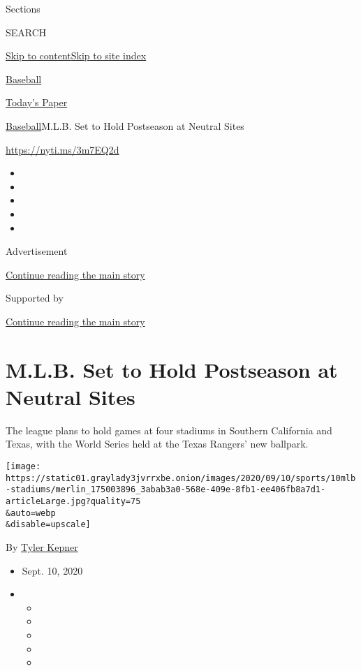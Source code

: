 Sections

SEARCH

\protect\hyperlink{site-content}{Skip to
content}\protect\hyperlink{site-index}{Skip to site index}

\href{https://www.nytimes3xbfgragh.onion/section/sports/baseball}{Baseball}

\href{https://myaccount.nytimes3xbfgragh.onion/auth/login?response_type=cookie\&client_id=vi}{}

\href{https://www.nytimes3xbfgragh.onion/section/todayspaper}{Today's
Paper}

\href{/section/sports/baseball}{Baseball}\textbar{}M.L.B. Set to Hold
Postseason at Neutral Sites

\url{https://nyti.ms/3m7EQ2d}

\begin{itemize}
\item
\item
\item
\item
\item
\end{itemize}

Advertisement

\protect\hyperlink{after-top}{Continue reading the main story}

Supported by

\protect\hyperlink{after-sponsor}{Continue reading the main story}

\hypertarget{mlb-set-to-hold-postseason-at-neutral-sites}{%
\section{M.L.B. Set to Hold Postseason at Neutral
Sites}\label{mlb-set-to-hold-postseason-at-neutral-sites}}

The league plans to hold games at four stadiums in Southern California
and Texas, with the World Series held at the Texas Rangers' new
ballpark.

\texttt{[image: https://static01.graylady3jvrrxbe.onion/images/2020/09/10/sports/10mlb-stadiums/merlin\_175003896\_3abab3a0-568e-409e-8fb1-ee406fb8a7d1-articleLarge.jpg?quality=75\\\&auto=webp\\\&disable=upscale]}

By \href{https://www.nytimes3xbfgragh.onion/by/tyler-kepner}{Tyler
Kepner}

\begin{itemize}
\item
  Sept. 10, 2020
\item
  \begin{itemize}
  \item
  \item
  \item
  \item
  \item
  \end{itemize}
\end{itemize}

